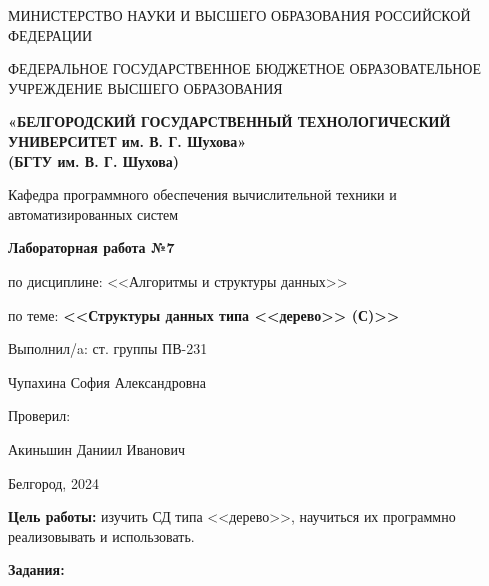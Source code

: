 \documentclass[12pt]{article}
\begin{document}
	\begin{center}
		{\parskip=1cm
			МИНИСТЕРСТВО НАУКИ И ВЫСШЕГО ОБРАЗОВАНИЯ РОССИЙСКОЙ ФЕДЕРАЦИИ
			
			ФЕДЕРАЛЬНОЕ ГОСУДАРСТВЕННОЕ БЮДЖЕТНОЕ ОБРАЗОВАТЕЛЬНОЕ УЧРЕЖДЕНИЕ ВЫСШЕГО ОБРАЗОВАНИЯ
			
			{\bf«БЕЛГОРОДСКИЙ ГОСУДАРСТВЕННЫЙ ТЕХНОЛОГИЧЕСКИЙ УНИВЕРСИТЕТ им. В. Г. Шухова»\\(БГТУ им. В. Г. Шухова)}
			
			
			\begin{figure}[bh]
			\noindent{}
			\end{figure}
			Кафедра программного обеспечения вычислительной техники и автоматизированных систем
		}
		{\parskip=0.25cm
			{\Large 
				{\bf Лабораторная работа №7}
			
				по дисциплине: <<Алгоритмы и структуры данных>>
			
				по теме: {\bf <<Структуры данных типа <<дерево>> (С)>>}
			}
		}
	\end{center}
	\begin{flushright}
		{\parskip=3cm Выполнил/a: ст. группы ПВ-231}
		
		Чупахина София Александровна
		
		Проверил:
		
		Акиньшин Даниил Иванович
	\end{flushright}
	\begin{center}
		{\parskip=3cm Белгород, 2024}
	\end{center}
	\newpage
	
	{\bf Цель работы:} изучить СД типа <<дерево>>, научиться их программно реализовывать и использовать.
	
	{\bf Задания:}
	
	
\end{document}
